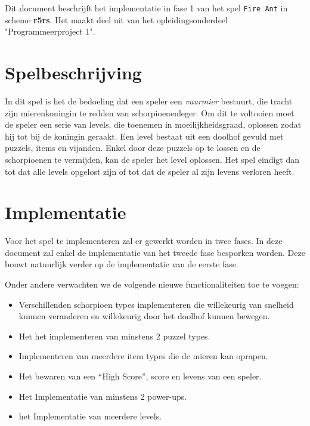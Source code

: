 Dit document beschrijft het implementatie in fase 1 van het spel \texttt{Fire Ant} in scheme \textbf{r5rs}.
Het maakt deel uit van het opleidingsonderdeel "Programmeerproject 1".

\section{Spelbeschrijving}
In dit spel is het de bedoeling dat een speler een \textit{vuurmier} bestuurt,
die tracht zijn mierenkoningin te redden van schorpioenenleger.
Om dit te voltooien moet de speler een serie van levels, die toenemen in moeilijkheidsgraad,
oplossen zodat hij tot bij de koningin geraakt.
Een level bestaat uit een doolhof gevuld met puzzels, items en vijanden.
Enkel door deze puzzels op te lossen en de schorpioenen te vermijden, kan de speler het level oplossen.
Het spel eindigt dan tot dat alle levels opgelost zijn of tot dat de speler al zijn levens verloren heeft.

\section{Implementatie}
Voor het spel te implementeren zal er gewerkt worden in twee fases.
In deze document zal enkel de implementatie van het tweede fase besporken worden.
Deze bouwt natuurlijk verder op de implementatie van de eerste fase.

Onder andere verwachten we de volgende nieuwe functionaliteiten toe te voegen:
\begin{itemize}
	\item Verschillenden schorpioen types implementeren
		die willekeurig van snelheid kunnen veranderen
		en willekeurig door het doolhof kunnen bewegen.
	\item Het het implementeren van minstens 2 puzzel types.
	\item Implementeren van meerdere item types die de mieren kan oprapen.
	\item Het bewaren van een  ``High Score'', score en levens van een speler.
	\item Het Implementatie van minstens 2 power-ups.
	\item het Implementatie van meerdere levels.
	\end{itemize}

